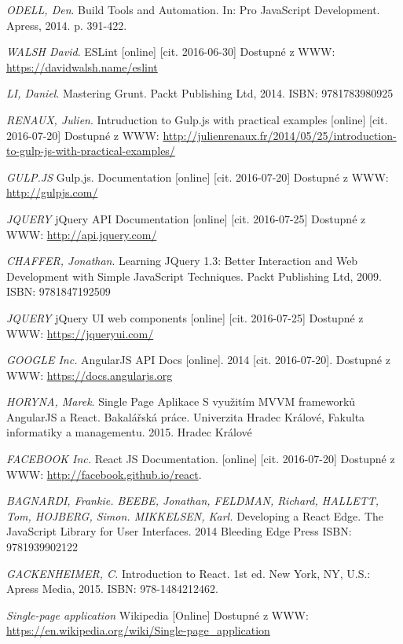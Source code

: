 \begin{thebibliography}{10}
 \textit{ODELL, Den}. Build Tools and Automation. In: Pro JavaScript Development. Apress, 2014. p. 391-422.

 \textit{WALSH David}. ESLint [online] [cit. 2016-06-30] Dostupné z WWW: \url{https://davidwalsh.name/eslint}

 \textit{LI, Daniel}. Mastering Grunt. Packt Publishing Ltd, 2014. ISBN: 9781783980925

 \textit{RENAUX, Julien}. Intruduction to Gulp.js with practical examples [online] [cit. 2016-07-20] Dostupné z WWW: \url{http://julienrenaux.fr/2014/05/25/introduction-to-gulp-js-with-practical-examples/}

 \textit{GULP.JS} Gulp.js. Documentation [online] [cit. 2016-07-20] Dostupné z WWW: \url{http://gulpjs.com/}

 \textit{JQUERY} jQuery API Documentation [online] [cit. 2016-07-25] Dostupné z WWW: \url{http://api.jquery.com/}

 \textit{CHAFFER, Jonathan}. Learning JQuery 1.3: Better Interaction and Web Development with Simple JavaScript Techniques. Packt Publishing Ltd, 2009. ISBN: 9781847192509

 \textit{JQUERY} jQuery UI web components [online] [cit. 2016-07-25] Dostupné z WWW: \url{https://jqueryui.com/}

 \textit{GOOGLE Inc.} AngularJS API Docs [online]. 2014 [cit. 2016-07-20]. Dostupné z WWW: \url{https://docs.angularjs.org}

 \textit{HORYNA, Marek}. Single Page Aplikace S využitím MVVM frameworků AngularJS a React. Bakalářská práce. Univerzita Hradec Králové, Fakulta informatiky a managementu. 2015. Hradec Králové

 \textit{FACEBOOK Inc.} React JS Documentation. [online] [cit. 2016-07-20] Dostupné z WWW: \url{http://facebook.github.io/react}.

 \textit{BAGNARDI, Frankie. BEEBE, Jonathan, FELDMAN, Richard, HALLETT, Tom,  HOJBERG, Simon. MIKKELSEN, Karl.} Developing a React Edge. The JavaScript Library for User Interfaces. 2014 Bleeding Edge Press ISBN: 9781939902122

 \textit{GACKENHEIMER, C.}  Introduction to React. 1st ed. New York, NY, U.S.: Apress Media, 2015. ISBN: 978-1484212462.

 \textit{Single-page application} Wikipedia [Online] Dostupné z WWW: \url{https://en.wikipedia.org/wiki/Single-page_application}


\end{thebibliography}
